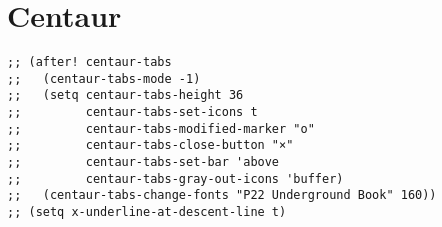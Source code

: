 \documentclass[c]{article}
\theoremstyle{plain}%
\theoremstyle{definition}
\theoremstyle{remark}
\begin{document}
\section{Centaur}
\label{sec:orgf693d09}
\begin{verbatim}
;; (after! centaur-tabs
;;   (centaur-tabs-mode -1)
;;   (setq centaur-tabs-height 36
;;         centaur-tabs-set-icons t
;;         centaur-tabs-modified-marker "o"
;;         centaur-tabs-close-button "×"
;;         centaur-tabs-set-bar 'above
;;         centaur-tabs-gray-out-icons 'buffer)
;;   (centaur-tabs-change-fonts "P22 Underground Book" 160))
;; (setq x-underline-at-descent-line t)
\end{verbatim}
\end{document}
